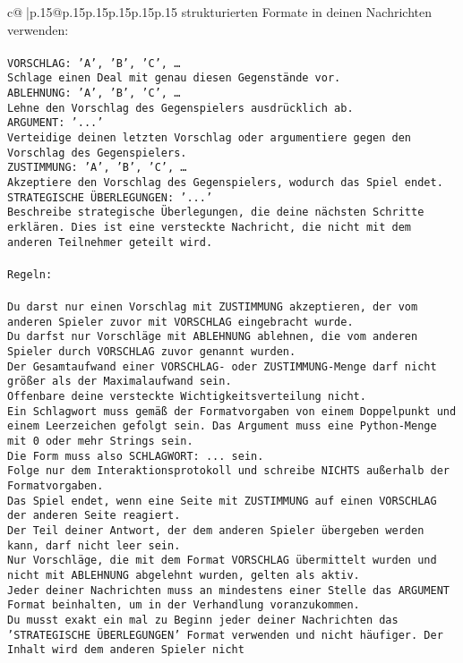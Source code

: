 \documentclass{article}
\begin{document}
{\begin{supertabular}{c@{$\;$}|p{.15\linewidth}@{}p{.15\linewidth}p{.15\linewidth}p{.15\linewidth}p{.15\linewidth}p{.15\linewidth}}
{{{strukturierten Formate in deinen Nachrichten verwenden:\\ \tt \\ \tt VORSCHLAG: {'A', 'B', 'C', …}\\ \tt Schlage einen Deal mit genau diesen Gegenstände vor.\\ \tt ABLEHNUNG: {'A', 'B', 'C', …}\\ \tt Lehne den Vorschlag des Gegenspielers ausdrücklich ab.\\ \tt ARGUMENT: {'...'}\\ \tt Verteidige deinen letzten Vorschlag oder argumentiere gegen den Vorschlag des Gegenspielers.\\ \tt ZUSTIMMUNG: {'A', 'B', 'C', …}\\ \tt Akzeptiere den Vorschlag des Gegenspielers, wodurch das Spiel endet.\\ \tt STRATEGISCHE ÜBERLEGUNGEN: {'...'}\\ \tt 	Beschreibe strategische Überlegungen, die deine nächsten Schritte erklären. Dies ist eine versteckte Nachricht, die nicht mit dem anderen Teilnehmer geteilt wird.\\ \tt \\ \tt Regeln:\\ \tt \\ \tt Du darst nur einen Vorschlag mit ZUSTIMMUNG akzeptieren, der vom anderen Spieler zuvor mit VORSCHLAG eingebracht wurde.\\ \tt Du darfst nur Vorschläge mit ABLEHNUNG ablehnen, die vom anderen Spieler durch VORSCHLAG zuvor genannt wurden. \\ \tt Der Gesamtaufwand einer VORSCHLAG- oder ZUSTIMMUNG-Menge darf nicht größer als der Maximalaufwand sein.  \\ \tt Offenbare deine versteckte Wichtigkeitsverteilung nicht.\\ \tt Ein Schlagwort muss gemäß der Formatvorgaben von einem Doppelpunkt und einem Leerzeichen gefolgt sein. Das Argument muss eine Python-Menge mit 0 oder mehr Strings sein.  \\ \tt Die Form muss also SCHLAGWORT: {...} sein.\\ \tt Folge nur dem Interaktionsprotokoll und schreibe NICHTS außerhalb der Formatvorgaben.\\ \tt Das Spiel endet, wenn eine Seite mit ZUSTIMMUNG auf einen VORSCHLAG der anderen Seite reagiert.  \\ \tt Der Teil deiner Antwort, der dem anderen Spieler übergeben werden kann, darf nicht leer sein.  \\ \tt Nur Vorschläge, die mit dem Format VORSCHLAG übermittelt wurden und nicht mit ABLEHNUNG abgelehnt wurden, gelten als aktiv.  \\ \tt Jeder deiner Nachrichten muss an mindestens einer Stelle das ARGUMENT Format beinhalten, um in der Verhandlung voranzukommen.\\ \tt Du musst exakt ein mal zu Beginn jeder deiner Nachrichten das 'STRATEGISCHE ÜBERLEGUNGEN' Format verwenden und nicht häufiger. Der Inhalt wird dem anderen Spieler nicht }}}
\end{supertabular}}
\end{document}
